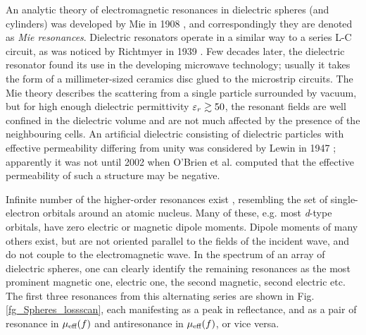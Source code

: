 An analytic theory of electromagnetic resonances in dielectric spheres (and cylinders) was developed by Mie in 1908 \cite{mie1908beitrage}, and correspondingly they are denoted as \textit{Mie resonances}. 
Dielectric resonators operate in a similar way to a series L-C circuit, as was noticed by Richtmyer in 1939 \cite{richtmyer1939dielectric}. Few decades later, the dielectric resonator found its use in the developing microwave technology; usually it takes the form of a millimeter-sized ceramics disc glued to the microstrip circuits. 
The Mie theory describes the scattering from a single particle surrounded by vacuum, but for high enough dielectric permittivity $\varepsilon_r \gtrsim 50$, the resonant fields are well confined in the dielectric volume and are not much affected by the presence of the neighbouring cells.
An artificial dielectric consisting of dielectric particles with effective permeability differing from unity was considered by Lewin in 1947 \cite{lewin1947electrical}; apparently it was not until 2002 when O'Brien et al. computed \cite{obrien2002photonic} that the effective permeability of such a structure may be negative.
\label{negn_diel}


Infinite number of the higher-order resonances exist \cite[pp. 407-408]{mie1908beitrage}, resembling the set of single-electron orbitals around an atomic nucleus. Many of these, e.g. most \textit{d}-type orbitals, have zero electric or magnetic dipole moments. Dipole moments of many others exist, but are not oriented parallel to the fields of the incident wave, and do not couple to the electromagnetic wave. In the spectrum of an array of dielectric spheres, one can clearly identify the remaining resonances as the most prominent magnetic one, electric one, the second magnetic, second electric etc. The first three resonances from this alternating series are shown in Fig. \ref{fg_Spheres_lossscan}, each manifesting as a peak in reflectance, and as a pair of resonance in $\mu_{\text{eff} }(f)$ and antiresonance in $\mu_{\text{eff} }(f)$, or vice versa.


